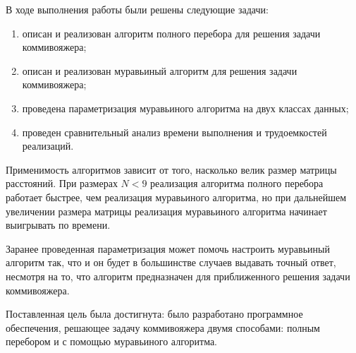 \vspace{\baselineskip}

В ходе выполнения работы были решены следующие задачи:

\begin{enumerate}[label=---]
	\item описан и реализован алгоритм полного перебора для решения задачи коммивояжера;
	\item описан и реализован муравьиный алгоритм для решения задачи коммивояжера;
	\item проведена параметризация муравьиного алгоритма на двух классах данных;
	\item проведен сравнительный анализ времени выполнения и трудоемкостей реализаций.
\end{enumerate}

Применимость алгоритмов зависит от того, насколько велик размер матрицы расстояний.
При размерах $N < 9$ реализация алгоритма полного перебора работает быстрее, чем реализация муравьиного алгоритма, но при дальнейшем увеличении размера матрицы реализация муравьиного алгоритма начинает выигрывать по времени. 

Заранее проведенная параметризация может помочь настроить муравьиный алгоритм так, что и он будет в большинстве случаев выдавать точный ответ, несмотря на то, что алгоритм предназначен для приближенного решения задачи коммивояжера.

Поставленная цель была достигнута: было разработано программное обеспечения, решающее задачу коммивояжера двумя способами: полным перебором и с помощью муравьиного алгоритма.